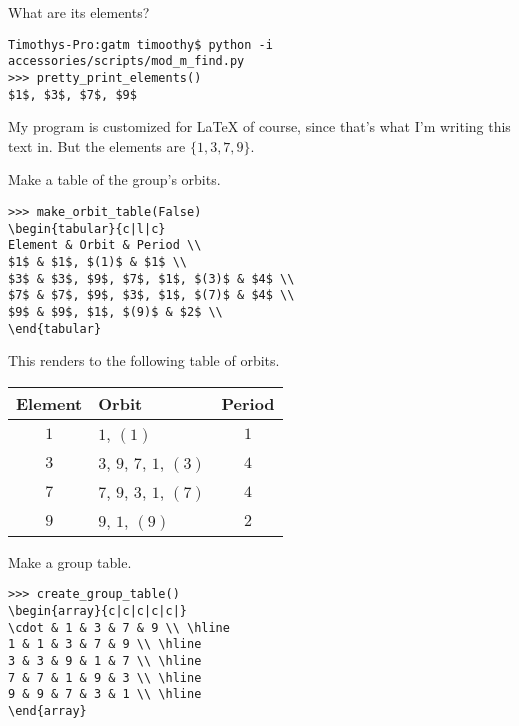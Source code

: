 \documentclass[../gatm_answers.tex]{subfiles}
\begin{document}
\begin{inner_problem}[start=1]
\item What are its elements?
\end{inner_problem}

\begin{verbatim}
Timothys-Pro:gatm timoothy$ python -i accessories/scripts/mod_m_find.py
>>> pretty_print_elements()
$1$, $3$, $7$, $9$
\end{verbatim}

My program is customized for \LaTeX{} of course, since that's what I'm writing this text in. But the elements are $\{1,3,7,9\}$.

\begin{inner_problem}
\item Make a table of the group's orbits.
\end{inner_problem}

\begin{verbatim}
>>> make_orbit_table(False)
\begin{tabular}{c|l|c}
Element & Orbit & Period \\
$1$ & $1$, $(1)$ & $1$ \\
$3$ & $3$, $9$, $7$, $1$, $(3)$ & $4$ \\
$7$ & $7$, $9$, $3$, $1$, $(7)$ & $4$ \\
$9$ & $9$, $1$, $(9)$ & $2$ \\
\end{tabular}
\end{verbatim}

This renders to the following table of orbits.

\begin{tabular}{c|l|c}
Element & Orbit & Period \\ \hline
$1$ & $1$, $(1)$ & $1$ \\
$3$ & $3$, $9$, $7$, $1$, $(3)$ & $4$ \\
$7$ & $7$, $9$, $3$, $1$, $(7)$ & $4$ \\
$9$ & $9$, $1$, $(9)$ & $2$ \\
\end{tabular}

\begin{inner_problem}
\item Make a group table.
\end{inner_problem}

\begin{verbatim}
>>> create_group_table()
\begin{array}{c|c|c|c|c|}
\cdot & 1 & 3 & 7 & 9 \\ \hline
1 & 1 & 3 & 7 & 9 \\ \hline
3 & 3 & 9 & 1 & 7 \\ \hline
7 & 7 & 1 & 9 & 3 \\ \hline
9 & 9 & 7 & 3 & 1 \\ \hline
\end{array}
\end{verbatim}
\end{document}

